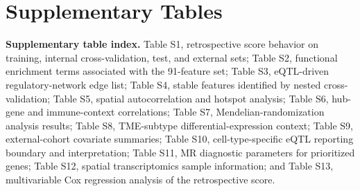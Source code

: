 \documentclass[a4paper,12pt]{article}
\begin{document}
\newpage

\section{Supplementary Tables}

\noindent\textbf{Supplementary table index.}
Table S1, retrospective score behavior on training, internal cross-validation, test, and external sets;
Table S2, functional enrichment terms associated with the 91-feature set;
Table S3, eQTL-driven regulatory-network edge list;
Table S4, stable features identified by nested cross-validation;
Table S5, spatial autocorrelation and hotspot analysis;
Table S6, hub-gene and immune-context correlations;
Table S7, Mendelian-randomization analysis results;
Table S8, TME-subtype differential-expression context;
Table S9, external-cohort covariate summaries;
Table S10, cell-type-specific eQTL reporting boundary and interpretation;
Table S11, MR diagnostic parameters for prioritized genes;
Table S12, spatial transcriptomics sample information; and
Table S13, multivariable Cox regression analysis of the retrospective score.

\clearpage
\end{document}
